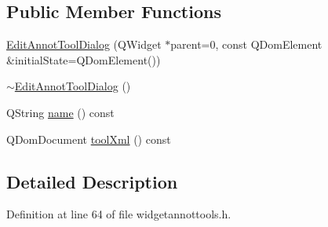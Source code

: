 \subsection*{Public Member Functions}
\begin{DoxyCompactItemize}
\item 
\hyperlink{classEditAnnotToolDialog_a888aad6d58062b78784ab82a7cac09d3}{Edit\+Annot\+Tool\+Dialog} (Q\+Widget $\ast$parent=0, const Q\+Dom\+Element \&initial\+State=Q\+Dom\+Element())
\item 
\hyperlink{classEditAnnotToolDialog_a25933915984c0b1dd8207ca116deca48}{$\sim$\+Edit\+Annot\+Tool\+Dialog} ()
\item 
Q\+String \hyperlink{classEditAnnotToolDialog_af181f94217d494467dfef926a9d182f6}{name} () const 
\item 
Q\+Dom\+Document \hyperlink{classEditAnnotToolDialog_af496090259097e144554d4c294213b96}{tool\+Xml} () const 
\end{DoxyCompactItemize}


\subsection{Detailed Description}


Definition at line 64 of file widgetannottools.\+h.



